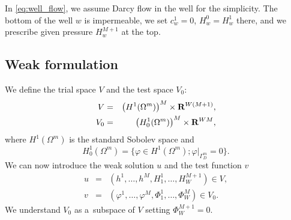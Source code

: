 %
In \eqref{eq:well_flow}, we assume Darcy flow in the well for the simplicity. The bottom of the well $w$ is impermeable,
we set $c^1_w=0$, $H^0_w=H^1_w$ there, and we prescribe given pressure $H^{M+1}_w$ at the top.


\subsection{Weak formulation}
We define the trial space $V$ and the test space $V_0$:
\begin{eqnarray} \label{eqn:spaces}
  V &=& \left(H^1(\Omega^m)\right)^M\times{\rm\bf R}^{W(M+1)}, \\
  V_0 &=& \left(H^1_0(\Omega^m)\right)^M\times{\rm\bf R}^{WM},
\end{eqnarray}
where $H^1(\Omega^m)$ is the standard Sobolev space and 
\[ H^1_0(\Omega^m)=\{\varphi\in H^1(\Omega^m); \varphi|_{\Gamma^m_D}=0\}. \]
We can now introduce the weak solution $u$ and the test function $v$
\begin{eqnarray} \label{eqn:solution}
   u &=& (h^1,\ldots, h^M, H^1_1,\ldots,H^{M+1}_W)\in V, \\
   v &=& (\varphi^1,\ldots, \varphi^M, \Phi^1_1,\ldots,\Phi^M_W)\in V_0.
\end{eqnarray}
We understand $V_0$ as a~subspace of $V$ setting $\Phi^{M+1}_W=0$.

